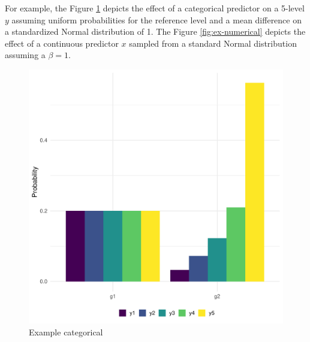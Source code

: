 \documentclass[
  man,floatsintext]{apa6}
\newenvironment{Shaded}{\begin{snugshade}}{\end{snugshade}}
\newcommand{\AttributeTok}[1]{\textcolor[rgb]{0.13,0.29,0.53}{#1}}
\newcommand{\FunctionTok}[1]{\textcolor[rgb]{0.13,0.29,0.53}{\textbf{#1}}}
\newcommand{\NormalTok}[1]{#1}
\newcommand{\SpecialCharTok}[1]{\textcolor[rgb]{0.81,0.36,0.00}{\textbf{#1}}}
\newcommand{\StringTok}[1]{\textcolor[rgb]{0.31,0.60,0.02}{#1}}
\begin{document}
\begin{Shaded}
\end{Shaded}

\normalsize

For example, the Figure \ref{fig:ex-categorical} depicts the effect of a categorical predictor on a 5-level \(y\) assuming uniform probabilities for the reference level and a mean difference on a standardized Normal distribution of 1. The Figure \ref{fig:ex-numerical} depicts the effect of a continuous predictor \(x\) sampled from a standard Normal distribution assuming a \(\beta = 1\).

\scriptsize

\begin{figure}

{\centering \includegraphics{paper-new_files/figure-latex/ex-categorical-1} 

}

\caption{Example categorical}\label{fig:ex-categorical}
\end{figure}
\end{document}
